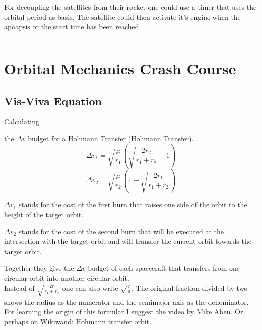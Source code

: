 \documentclass[12pt,paper=A4,numbers=noenddot,bibliography=totoc,listof=totoc,DIV=11,BCOR=1mm]{scrreprt}
\begin{document}
For decoupling the satellites from their rocket one could use a timer that uses the orbital period as basis. The satellite could then activate it's engine when the apoapsis or the start time has been reached.\\

\noindent
{\color{black} \rule{\linewidth}{0.1mm} }


\chapter{Orbital Mechanics Crash Course}
\section{Vis-Viva Equation}
\hypertarget{visviva}{Calculating} the $\Delta v$ budget for a \href{https://forum.kerbalspaceprogram.com/index.php?/topic/83437-illustrated-tutorial-for-orbital-rendezvous/}{Hohmann Transfer} (\href{https://imgur.com/a/DmGTv}{Hohmann Transfer}).
\begin{equation}
\label{eq:visviva1}
\Delta v_{1} = \sqrt{\frac{\mu}{r_{1}}} \left( \sqrt{\frac{2r_{2}}{r_{1}+r_{2}}}-1 \right)
\end{equation}
\begin{equation}
\label{eq:visviva2}
\Delta v_{2} = \sqrt{\frac{\mu}{r_{2}}} \left( 1-\sqrt{\frac{2r_{1}}{r_{1}+r_{2}}} \right)
\end{equation}

$\Delta v_{1}$ stands for the cost of the first burn that raises one side of the orbit to the height of the target orbit.

$\Delta v_{2}$ stands for the cost of the second burn that will be executed at the intersection with the target orbit and will transfer the current orbit towards the target orbit.

Together they give the $\Delta v$ budget of each spacecraft that transfers from one circular orbit into another circular orbit. \\
Instead of $\sqrt{\frac{2r}{r_{1}+r_{2}}}$ one can also write $\sqrt{\frac{r}{a}}$. The original fraction divided by two shows the radius as the numerator and the semimajor axis as the denominator.\\
For learning the origin of this formular I suggest the video by \href{https://youtu.be/7AkakB5TOSw}{Mike Aben}. Or perhaps on Wikiwand: \href{https://www.wikiwand.com/en/Hohmann_transfer_orbit}{Hohmann transfer orbit}.
\end{document}
